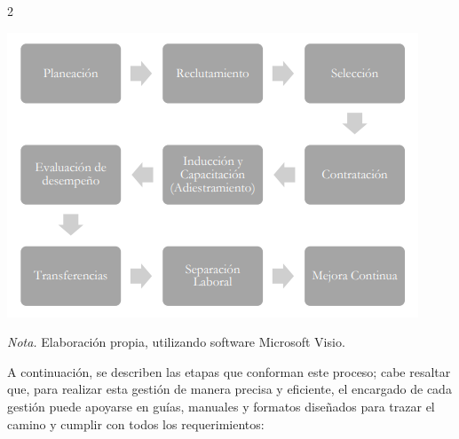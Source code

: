 \documentclass[12pt,spanish,Letterpaper,openany]{book}
\begin{document}
\begin {multicols}{2}
\begin {flushleft}
\begin{minipage}[c]{\columnwidth}
\begin{center}\includegraphics[width=0.95\linewidth]{imagenes_articulos/art05_01} \end{center}

\emph{Nota.} Elaboración propia, utilizando software Microsoft Visio.

\end{minipage}
\end {flushleft}

A continuación, se describen las etapas que conforman este proceso; cabe resaltar que, para realizar esta gestión de manera precisa y eficiente, el encargado de cada gestión puede apoyarse en guías, manuales y formatos diseñados para trazar el camino y cumplir con todos los requerimientos:


\end{multicols}
\end{document}
